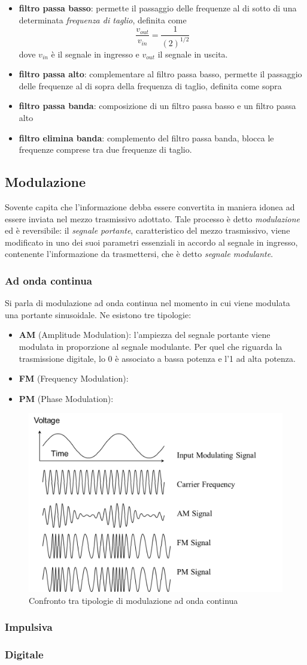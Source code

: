 \documentclass[a4paper,11pt]{article}
\def\sub#1{\subsection{#1}\label{#1}}
\def\subsub#1{\subsubsection{#1}\label{#1}}
\begin{document}
\begin{itemize}
\item \textbf{filtro passa basso}: permette il passaggio delle frequenze al di sotto di una determinata \textit{frequenza di taglio}, definita come \[\frac{v_{out}}{v_{in}}=\frac{1}{(2)^{1/2}}\]
dove $v_{in}$ è il segnale in ingresso e $v_{out}$ il segnale in uscita.
\item \textbf{filtro passa alto}: complementare al filtro passa basso, permette il passaggio delle frequenze al di sopra della frequenza di taglio, definita come sopra
\item \textbf{filtro passa banda}: composizione di un filtro passa basso e un filtro passa alto
\item \textbf{filtro elimina banda}: complemento del filtro passa banda, blocca le frequenze comprese tra due frequenze di taglio.
\end{itemize}

\sub{Modulazione}
Sovente capita che l'informazione debba essere convertita in maniera idonea ad essere inviata nel mezzo trasmissivo adottato. Tale processo è detto \textit{modulazione} ed è reversibile: il \textit{segnale portante}, caratteristico del mezzo trasmissivo, viene modificato in uno dei suoi parametri essenziali in accordo al segnale in ingresso, contenente l'informazione da trasmettersi, che è detto \textit{segnale modulante}.
\subsub{Ad onda continua}
Si parla di modulazione ad onda continua nel momento in cui viene modulata una portante sinusoidale. Ne esistono tre tipologie:
\begin{itemize}
\item \textbf{AM} (Amplitude Modulation): l'ampiezza del segnale portante viene modulata in proporzione al segnale modulante. Per quel che riguarda la trasmissione digitale, lo 0 è associato a bassa potenza e l'1 ad alta potenza.
\item \textbf{FM} (Frequency Modulation): 
\item \textbf{PM} (Phase Modulation): 
\end{itemize}
\begin{figure}[h]
\centering
\includegraphics[scale=0.5]{am_fm_pm.png}
\caption{Confronto tra tipologie di modulazione ad onda continua}\label{fig. 2}
\end{figure}
\subsub{Impulsiva}
\subsub{Digitale}
\end{document}
